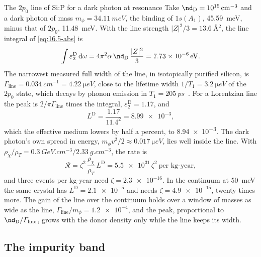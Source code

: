 \begin{workedexample}{The $2p_0$ line of Si:P for a dark photon at resonance}\label{we:16-sip-line}
Take $\nd_{\mathrm{D}} = \SI{e15}{cm^{-3}}$ and a dark photon of mass $m_\phi = \SI{34.11}{meV}$, the binding of $1s(A_1)$, \SI{45.59}{meV}, minus that of $2p_0$, \SI{11.48}{meV}. With the line strength $|Z|^2/3 = \SI{13.6}{\angstrom^2}$, the line integral of \cref{eq:16.5-abs} is
\begin{equation*}
  \int\varepsilon_2^{\mathrm{D}}\,\dd\omega = 4\pi^2\alpha\,\nd_{\mathrm{D}}\,\frac{|Z|^2}{3} = \SI{7.73e-6}{eV} .
\end{equation*}
The narrowest measured full width of the line, in isotopically purified silicon, is $\varGamma_{\mathrm{line}} = \SI{0.034}{cm^{-1}} = \SI{4.22}{\micro eV}$, close to the lifetime width $1/T_1 = \SI{3.2}{\micro eV}$ of the $2p_0$ state, which decays by phonon emission in $T_1 = \SI{205}{ps}$~\cite[p.~5]{vinh2008silicon}. For a Lorentzian line the peak is $2/\pi\varGamma_{\mathrm{line}}$ times the integral, $\varepsilon_2^{\mathrm{D}} = 1.17$, and
\begin{equation*}
  L^{\mathrm{D}} = \frac{1.17}{11.4^2} = \num{8.99e-3} ,
\end{equation*}
which the effective medium lowers by half a percent, to \num{8.94e-3}. The dark photon's own spread in energy, $m_\phi v^2/2 \approx \SI{0.017}{\micro eV}$, lies well inside the line. With $\rho_\chi/\rho_T = \SI{0.3}{GeV.cm^{-3}}/\SI{2.33}{g.cm^{-3}}$, the rate is
\begin{equation*}
  \mathcal{R} = \zeta^2\,\frac{\rho_\chi}{\rho_T}\,L^{\mathrm{D}} = \num{5.5e31}\,\zeta^2\ \text{per kg-year} ,
\end{equation*}
and three events per kg-year need $\zeta = \num{2.3e-16}$. In the continuum at \SI{50}{meV} the same crystal has $L^{\mathrm{D}} = \num{2.1e-5}$ and needs $\zeta = \num{4.9e-15}$, twenty times more. The gain of the line over the continuum holds over a window of masses as wide as the line, $\varGamma_{\mathrm{line}}/m_\phi = \num{1.2e-4}$, and the peak, proportional to $\nd_{\mathrm{D}}/\varGamma_{\mathrm{line}}$, grows with the donor density only while the line keeps its width.
\end{workedexample}

\subsection{The impurity band}\label{sec:16.5-band}

